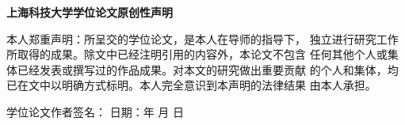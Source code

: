 \cleardoublepage
	\thispagestyle{empty}
	\begin{center}
		{\bfseries{} 上海科技大学学位论文原创性声明}
	\end{center}
	\vskip 10pt
	{\par{}本人郑重声明：所呈交的学位论文，是本人在导师的指导下， 
	独立进行研究工作所取得的成果。除文中已经注明引用的内容外，本论文不包含
	任何其他个人或集体已经发表或撰写过的作品成果。对本文的研究做出重要贡献
	的个人和集体，均已在文中以明确方式标明。本人完全意识到本声明的法律结果
	由本人承担。\par}
	\vskip 60pt
	\hspace{13em}学位论文作者签名：\hrulefill\hspace{1.5em}
	\vskip 15pt
	\hspace{16em}日\hspace{1em}期：\hrulefill\hrulefill 年 \hrulefill 月 \hrulefill 日\hspace{1em}

